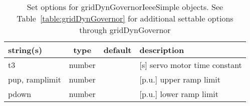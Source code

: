 \begin{table}[ht]
\centering
\begin{tabular}{p{5cm} c c p{7cm}}
\hline
string(s) & type & default & description \\
\hline
t3 & number &  & [s]    servo motor time constant\\
pup, ramplimit & number &  & [p.u.] upper ramp limit\\
pdown & number &  & [p.u.] lower ramp limit\\
\hline
\end{tabular}
\caption{Set options for gridDynGovernorIeeeSimple objects. See Table~\ref{table:gridDynGovernor} for additional settable options through gridDynGovernor}
\label{table:gridDynGovernorIeeeSimple}
\end{table}
